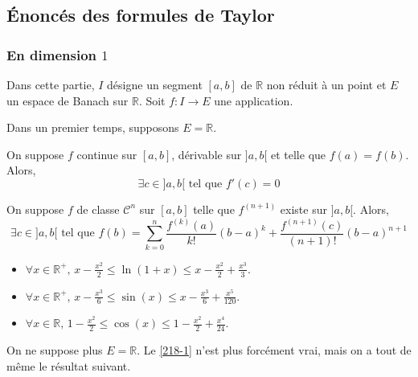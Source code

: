 



	
	\subsection{Énoncés des formules de Taylor}
	
	\subsubsection{En dimension \texorpdfstring{$1$}{1}}
	
	
	Dans cette partie, $I$ désigne un segment $[a,b]$ de $\mathbb{R}$ non réduit à un point et $E$ un espace de Banach sur $\mathbb{R}$. Soit $f : I \rightarrow E$ une application.
	
	Dans un premier temps, supposons $E = \mathbb{R}$.
	
	\begin{theorem}[Rolle]
		\label{218-1}
		On suppose $f$ continue sur $[a,b]$, dérivable sur $]a,b[$ et telle que $f(a) = f(b)$. Alors,
		\[ \exists c \in ]a,b[ \text{ tel que } f'(c) = 0 \]
	\end{theorem}
	
	\begin{theorem}
		On suppose $f$ de classe $\mathcal{C}^n$ sur $[a,b]$ telle que $f^{(n+1)}$ existe sur $]a,b[$. Alors,
		\[ \exists c \in ]a,b[ \text{ tel que } f(b) = \sum_{k=0}^{n} \frac{f^{(k)} (a)}{k!} (b-a)^k + \frac{f^{(n+1)}(c)}{(n+1)!} (b-a)^{n+1} \]
	\end{theorem}
	
	\begin{application}
		\begin{itemize}
			\item $\forall x \in \mathbb{R}^+, \, x - \frac{x^2}{2} \leq \ln(1+x) \leq x - \frac{x^2}{2} + \frac{x^3}{3}$.
			\item $\forall x \in \mathbb{R}^+, \, x - \frac{x^3}{6} \leq \sin(x) \leq x - \frac{x^3}{6} + \frac{x^5}{120}$.
			\item $\forall x \in \mathbb{R}, \, 1 - \frac{x^2}{2} \leq \cos(x) \leq 1 - \frac{x^2}{2} + \frac{x^4}{24}$.
		\end{itemize}
	\end{application}
	
	On ne suppose plus $E = \mathbb{R}$. Le \cref{218-1} n'est plus forcément vrai, mais on a tout de même le résultat suivant.
	
